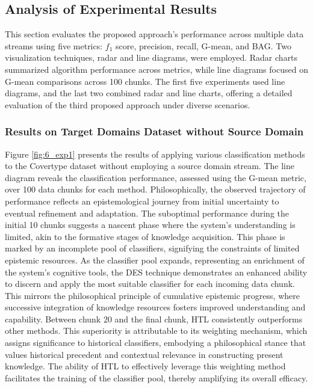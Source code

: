 \subsection{Analysis of Experimental Results}

This section evaluates the proposed approach's performance across multiple data streams using five metrics: $f_1$ score, precision, recall, G-mean, and BAG. Two visualization techniques, radar and line diagrams, were employed. Radar charts summarized algorithm performance across metrics, while line diagrams focused on G-mean comparisons across 100 chunks. The first five experiments used line diagrams, and the last two combined radar and line charts, offering a detailed evaluation of the third proposed approach under diverse scenarios.

\subsubsection{Results on Target Domains Dataset without Source Domain}
Figure \ref{fig:6_exp1} presents the results of applying various classification methods to the Covertype dataset without employing a source domain stream. The line diagram reveals the classification performance, assessed using the G-mean metric, over 100 data chunks for each method. Philosophically, the observed trajectory of performance reflects an epistemological journey from initial uncertainty to eventual refinement and adaptation. The suboptimal performance during the initial 10 chunks suggests a nascent phase where the system's understanding is limited, akin to the formative stages of knowledge acquisition. This phase is marked by an incomplete pool of classifiers, signifying the constraints of limited epistemic resources. As the classifier pool expands, representing an enrichment of the system’s cognitive tools, the DES technique demonstrates an enhanced ability to discern and apply the most suitable classifier for each incoming data chunk. This mirrors the philosophical principle of cumulative epistemic progress, where successive integration of knowledge resources fosters improved understanding and capability. Between chunk 20 and the final chunk, HTL consistently outperforms other methods. This superiority is attributable to its weighting mechanism, which assigns significance to historical classifiers, embodying a philosophical stance that values historical precedent and contextual relevance in constructing present knowledge. The ability of HTL to effectively leverage this weighting method facilitates the training of the classifier pool, thereby amplifying its overall efficacy.  
